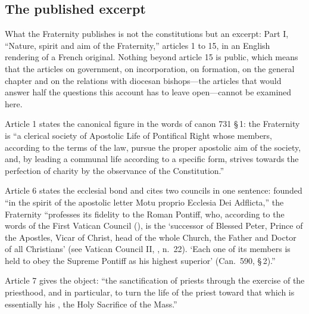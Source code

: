 \subsection{The published excerpt}

What the Fraternity publishes is not the constitutions but an excerpt:
Part I, ``Nature, spirit and aim of the Fraternity,'' articles 1 to 15,
in an English rendering of a French original. Nothing beyond article 15 is
public, which means that the articles on government, on incorporation, on
formation, on the general chapter and on the relations with diocesan
bishops---the articles that would answer half the questions this account
has to leave open---cannot be examined here.

Article 1 states the canonical figure in the words of canon 731 §\,1: the
Fraternity is ``a clerical society of Apostolic Life of Pontifical Right
whose members, according to the terms of the law, pursue the proper
apostolic aim of the society, and, by leading a communal life according
to a specific form, strives towards the perfection of charity by the
observance of the Constitution.''

Article 6 states the ecclesial bond and cites two councils in one
sentence: founded ``in the spirit of the apostolic letter Motu proprio
Ecclesia Dei Adflicta,'' the Fraternity ``professes its fidelity to the
Roman Pontiff, who, according to the words of the First Vatican Council
(), is the `successor of Blessed Peter, Prince of
the Apostles, Vicar of Christ, head of the whole Church, the Father and
Doctor of all Christians' (see Vatican Council II, ,
n.~22). `Each one of its members is held to obey the Supreme Pontiff as
his highest superior' (Can.\ 590, §\,2).''

Article 7 gives the object: ``the sanctification of priests through the
exercise of the priesthood, and in particular, to turn the life of the
priest toward that which is essentially his , the
Holy Sacrifice of the Mass.''


